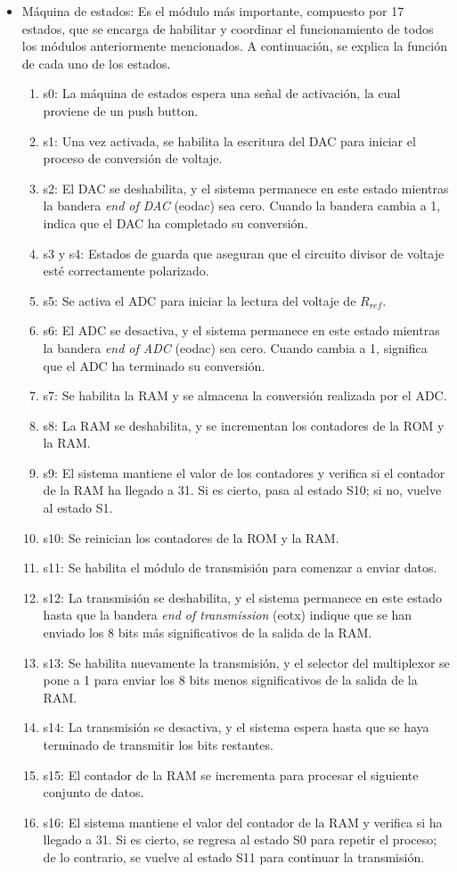 \begin{itemize}
    \item Máquina de estados: Es el módulo más importante, compuesto por 17 estados, que se encarga de habilitar y coordinar el funcionamiento de todos los módulos anteriormente mencionados. A continuación, se explica la función de cada uno de los estados.
    \begin{enumerate}
     \item s0: La máquina de estados espera una señal de activación, la cual proviene de un push button.
     \item s1: Una vez activada, se habilita la escritura del DAC para iniciar el proceso de conversión de voltaje.
     \item s2: El DAC se deshabilita, y el sistema permanece en este estado mientras la bandera \textit{end of DAC} (eodac) sea cero. Cuando la bandera cambia a 1, indica que el DAC ha completado su conversión.
     \item s3 y s4: Estados de guarda que aseguran que el circuito divisor de voltaje esté correctamente polarizado.
     \item s5: Se activa el ADC para iniciar la lectura del voltaje de $R_{ref}$.
     \item s6: El ADC se desactiva, y el sistema permanece en este estado mientras la bandera \textit{end of ADC} (eodac) sea cero. Cuando cambia a 1, significa que el ADC ha terminado su conversión.
     \item s7: Se habilita la RAM y se almacena la conversión realizada por el ADC.
     \item s8: La RAM se deshabilita, y se incrementan los contadores de la ROM y la RAM.
     \item s9: El sistema mantiene el valor de los contadores y verifica si el contador de la RAM ha llegado a 31. Si es cierto, pasa al estado S10; si no, vuelve al estado S1.
     \item s10: Se reinician los contadores de la ROM y la RAM.
     \item s11: Se habilita el módulo de transmisión para comenzar a enviar datos.
     \item s12: La transmisión se deshabilita, y el sistema permanece en este estado hasta que la bandera \textit{end of transmission} (eotx) indique que se han enviado los 8 bits más significativos de la salida de la RAM. 
     \item s13: Se habilita nuevamente la transmisión, y el selector del multiplexor se pone a 1 para enviar los 8 bits menos significativos de la salida de la RAM.
     \item s14: La transmisión se desactiva, y el sistema espera hasta que se haya terminado de transmitir los bits restantes.
     \item s15: El contador de la RAM se incrementa para procesar el siguiente conjunto de datos.
     \item s16: El sistema mantiene el valor del contador de la RAM y verifica si ha llegado a 31. Si es cierto, se regresa al estado S0 para repetir el proceso; de lo contrario, se vuelve al estado S11 para continuar la transmisión.           
    \end{enumerate}
\end{itemize}


